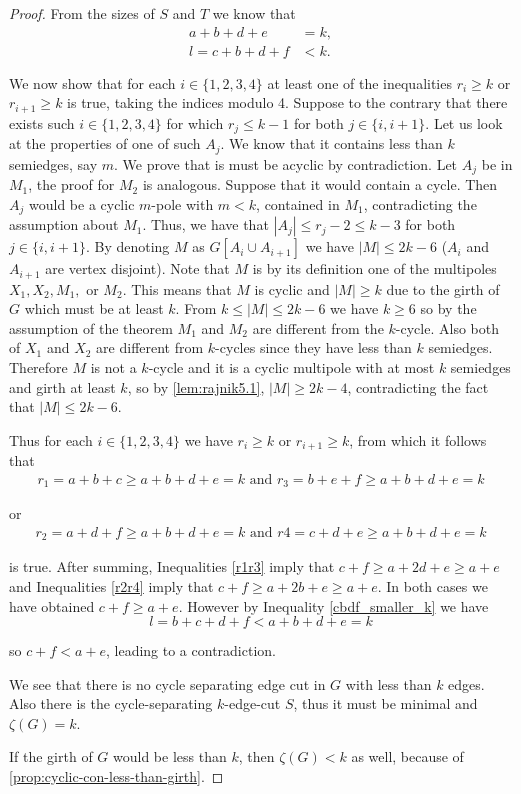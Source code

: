 \documentclass[12pt, twoside]{book}
\begin{document}
\begin{proof}
	From the sizes of $S$ and $T$ we know that
	\begin{align}
		a+b+d+e &= k, \label{abde_eq_k}\\
		l=c+b+d+f &< k. \label{cbdf_smaller_k}
	\end{align}
	
	We now show that for each $i\in\{1,2,3,4\}$ at least one of the inequalities $r_i\geq k$ or $r_{i+1}\geq k$ is true, taking the indices modulo 4. Suppose to the contrary that there exists such $i\in\{1,2,3,4\}$ for which $r_j\leq k-1$ for both $j\in\{i, i+1\}$. Let us look at the properties of one of such $A_j$. We know that it contains less than $k$ semiedges, say $m$. We prove that is must be acyclic by contradiction. Let $A_j$ be in $M_1$, the proof for $M_2$ is analogous. Suppose that it would contain a cycle. Then $A_j$ would be a cyclic $m$-pole with $m<k$, contained in $M_1$, contradicting the assumption about $M_1$. Thus, we have that $|A_j|\leq r_j-2\leq k-3$  for both $j\in \{i, i+1\}$. By denoting $M$ as $G[A_i\cup A_{i+1}]$ we have $|M|\leq 2k-6$ ($A_i$ and $A_{i+1}$ are vertex disjoint). Note that $M$ is by its definition one of the multipoles $X_1, X_2, M_1,$ or $M_2$. This means that $M$ is cyclic and $|M|\geq k$ due to the girth of $G$ which must be at least $k$. From $k\leq |M|\leq 2k-6$ we have $k\geq 6$ so by the assumption of the theorem $M_1$ and $M_2$ are different from the $k$-cycle. Also both of $X_1$ and $X_2$ are different from $k$-cycles since they have less than $k$ semiedges. Therefore $M$ is not a $k$-cycle and it is a cyclic multipole with at most $k$ semiedges and girth at least $k$, so by \cref{lem:rajnik5.1}, $|M| \geq 2k - 4$, contradicting the fact that $|M|\leq 2k-6$.
	
	Thus for each $i\in\{1,2,3,4\}$ we have $r_i\geq k$ or $r_{i+1}\geq k$, from which it follows that
	\begin{align}
		r_1 =a+b+c\geq a+b+d+e=k \text{ and } r_3 =b+e+f \geq a+b+d+e=k\label{r1r3}
	\end{align}
	
	or
	\begin{align}
		r_2 =a+d+f \geq a+b+d+e=k \text{ and } r4 =c+d+e\geq a+b+d+e=k\label{r2r4}
	\end{align}
	
	is true. After summing, Inequalities \cref{r1r3} imply that $c+f\geq a+2d+e\geq a+e$ and Inequalities \cref{r2r4} imply that $c+f\geq a+2b+e\geq a+e$. In both cases we have obtained $c+f\geq a+e$. However by Inequality \cref{cbdf_smaller_k} we have 
	$$l=b+c+d+f<a+b+d+e=k$$
	
	so $c+f<a+e$, leading to a contradiction.
	
	We see that there is no cycle separating edge cut in $G$ with less than $k$ edges. Also there is the cycle-separating $k$-edge-cut $S$, thus it must be minimal and $\zeta(G)=k$.
	
	If the girth of $G$ would be less than $k$, then $\zeta(G)<k$ as well, because of \cref{prop:cyclic-con-less-than-girth}.
\end{proof}
\end{document}
